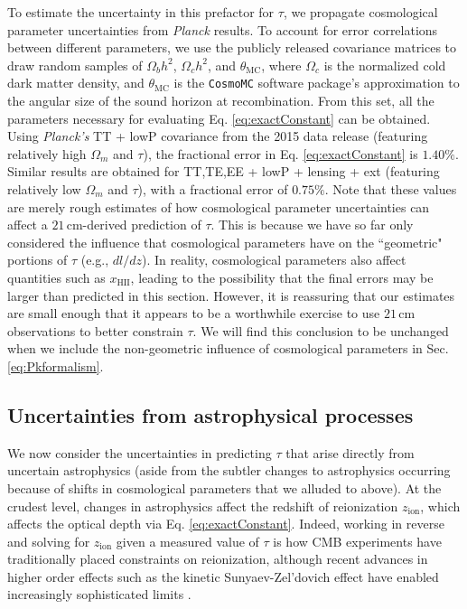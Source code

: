 \documentclass[twocolumn,aps,prd,nofootinbib,showpacs,superscriptaddress]{revtex4-1}
\begin{document}
To estimate the uncertainty in this prefactor for $\tau$, we propagate cosmological parameter uncertainties from \emph{Planck} results. To account for error correlations between different parameters, we use the publicly released covariance matrices to draw random samples of $\Omega_b h^2$, $\Omega_c h^2$, and $\theta_\textrm{MC}$, where $\Omega_c$ is the normalized cold dark matter density, and $\theta_\textrm{MC}$ is the {\tt CosmoMC} software package's \cite{lewis_and_bridle2002} approximation to the angular size of the sound horizon at recombination. From this set, all the parameters necessary for evaluating Eq. \eqref{eq:exactConstant} can be obtained. Using \emph{Planck's} TT + lowP covariance from the 2015 data release (featuring relatively high $\Omega_m$ and $\tau$), the fractional error in Eq. \eqref{eq:exactConstant} is $1.40\%$. Similar results are obtained for TT,TE,EE + lowP + lensing + ext (featuring relatively low $\Omega_m$ and $\tau$), with a fractional error of $0.75\%$. Note that these values are merely rough estimates of how cosmological parameter uncertainties can affect a $21\,\textrm{cm}$-derived prediction of $\tau$. This is because we have so far only considered the influence that cosmological parameters have on the ``geometric" portions of $\tau$ (e.g., $dl/dz$). In reality, cosmological parameters also affect quantities such as $x_\textrm{HII}$, leading to the possibility that the final errors may be larger than predicted in this section. However, it is reassuring that our estimates are small enough that it appears to be a worthwhile exercise to use $21\,\textrm{cm}$ observations to better constrain $\tau$. We will find this conclusion to be unchanged when we include the non-geometric influence of cosmological parameters in Sec. \ref{eq:Pkformalism}.



\subsection{Uncertainties from astrophysical processes}
\label{sec:astroUncertainties}

We now consider the uncertainties in predicting $\tau$ that arise directly from uncertain astrophysics (aside from the subtler changes to astrophysics occurring because of shifts in cosmological parameters that we alluded to above). At the crudest level, changes in astrophysics affect the redshift of reionization $z_\textrm{ion}$, which affects the optical depth via Eq. \eqref{eq:exactConstant}. Indeed, working in reverse and solving for $z_\textrm{ion}$ given a measured value of $\tau$ is how CMB experiments have traditionally placed constraints on reionization, although recent advances in higher order effects such as the kinetic Sunyaev-Zel'dovich effect have enabled increasingly sophisticated limits \cite{zahn_et_al2012,sievers_et_al2013,george_et_al2015}.
\end{document}
